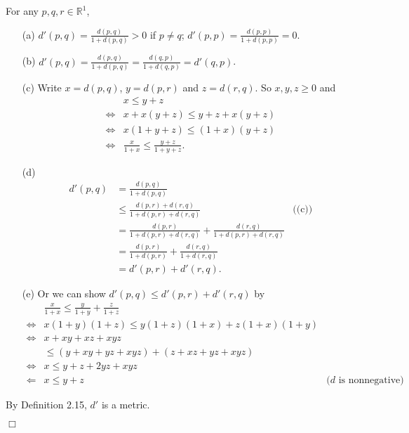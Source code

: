 \documentclass{article}
\begin{document}
\begin{enumerate}
  For any $p, q, r \in \mathbb{R}^1$,
  \begin{enumerate}
  \item[(a)]
  $d'(p,q) = \frac{d(p,q)}{1+d(p,q)} > 0$ if $p \neq q$;
  $d'(p,p) = \frac{d(p,p)}{1+d(p,p)} = 0$.
  \item[(b)]
  $d'(p,q) = \frac{d(p,q)}{1+d(p,q)}
  = \frac{d(q,p)}{1+d(q,p)} = d'(q,p)$.
  \item[(c)]
  Write $x = d(p,q)$, $y = d(p,r)$ and $z = d(r,q)$.
  So $x, y, z \geq 0$ and
    \begin{align*}
    &x \leq y + z \\
    \Longleftrightarrow&
    x + x(y+z) \leq y+z + x(y+z) \\
    \Longleftrightarrow&
    x(1+y+z) \leq (1+x)(y+z) \\
    \Longleftrightarrow&
    \frac{x}{1+x} \leq \frac{y+z}{1+y+z}.
    \end{align*}
  \item[(d)]
    \begin{align*}
    d'(p,q) &= \frac{d(p,q)}{1+d(p,q)} \\
    &\leq \frac{d(p,r)+d(r,q)}{1+d(p,r)+d(r,q)}
      &\text{((c))} \\
    &= \frac{d(p,r)}{1+d(p,r)+d(r,q)} + \frac{d(r,q)}{1+d(p,r)+d(r,q)} \\
    &= \frac{d(p,r)}{1+d(p,r)} + \frac{d(r,q)}{1+d(r,q)} \\
    &= d'(p,r) + d'(r,q).
    \end{align*}
  \item[(e)]
  Or we can show $d'(p,q) \leq d'(p,r) + d'(r,q)$ by
    \begin{align*}
    &\frac{x}{1+x} \leq \frac{y}{1+y} + \frac{z}{1+z} \\
    \Longleftrightarrow&
    x(1+y)(1+z) \leq y(1+z)(1+x) + z(1+x)(1+y) \\
    \Longleftrightarrow&
    x+xy+xz+xyz \\
    &\leq (y+xy+yz+xyz) + (z+xz+yz+xyz) \\
    \Longleftrightarrow&
    x \leq y+z+2yz+xyz \\
    \Longleftarrow&
    x \leq y+z
      &\text{($d$ is nonnegative)}
    \end{align*}
  \end{enumerate}
  By Definition 2.15, $d'$ is a metric.
\end{enumerate}
$\Box$ \\\\
\end{document}
